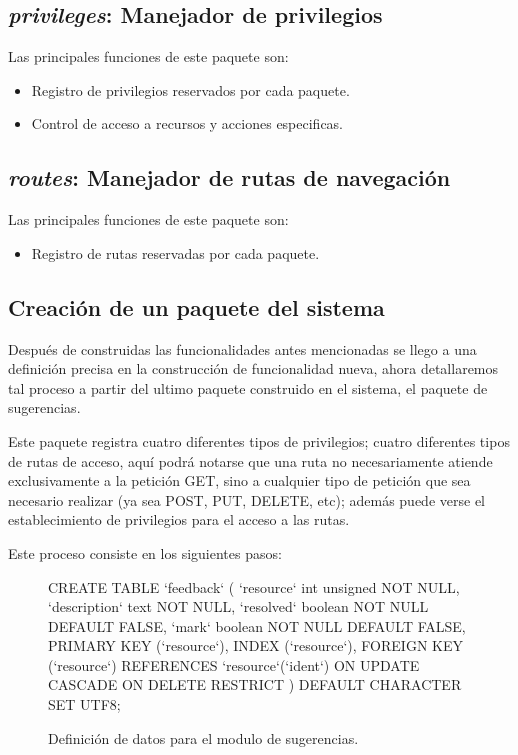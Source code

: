 \subsection{\emph{privileges}: Manejador de privilegios}
Las principales funciones de este paquete son:

\begin{itemize}
\item Registro de privilegios reservados por cada paquete.
\item Control de acceso a recursos y acciones especificas.
\end{itemize}

\subsection{\emph{routes}: Manejador de rutas de navegación}
Las principales funciones de este paquete son:

\begin{itemize}
\item Registro de rutas reservadas por cada paquete.
\end{itemize}

\subsection{Creación de un paquete del sistema}
Después de construidas las funcionalidades antes mencionadas se llego a una
definición precisa en la construcción de funcionalidad nueva, ahora detallaremos
tal proceso a partir del ultimo paquete construido en el sistema, el paquete de
sugerencias.

Este paquete registra cuatro diferentes tipos de privilegios; cuatro diferentes
tipos de rutas de acceso, aquí podrá notarse que una ruta no necesariamente
atiende exclusivamente a la petición GET, sino a cualquier tipo de petición que
sea necesario realizar (ya sea POST, PUT, DELETE, etc); además puede verse el
establecimiento de privilegios para el acceso a las rutas.

Este proceso consiste en los siguientes pasos:

\begin{figure}
\centering
\begin{SQL}
CREATE TABLE `feedback` (
    `resource`    int unsigned NOT NULL,
    `description` text         NOT NULL,
    `resolved`    boolean      NOT NULL DEFAULT FALSE,
    `mark`        boolean      NOT NULL DEFAULT FALSE,
    PRIMARY KEY (`resource`),
    INDEX (`resource`),
    FOREIGN KEY (`resource`) REFERENCES `resource`(`ident`)
        ON UPDATE CASCADE ON DELETE RESTRICT
) DEFAULT CHARACTER SET UTF8;
\end{SQL}
\caption{Definición de datos para el modulo de sugerencias.}
\label{code1}
\end{figure}


